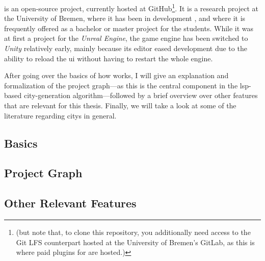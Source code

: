 \documentclass[../thesis]{subfiles}
\begin{document}

\SEE{} is an open-source project, currently hosted at GitHub\footnote{ (but note that, to clone this repository, you additionally need access to the Git LFS counterpart hosted at the University of Bremen's GitLab, as this is where paid plugins for \SEE{} are hosted.)}.
It is a research project at the University of Bremen, where it has been in development , and where it is frequently offered as a bachelor or master project for the students.
While it was at first a project for the \emph{Unreal Engine}, the game engine has been switched to \emph{Unity} relatively early, mainly because its editor eased development due to the ability to reload the \gls*{ui} without having to restart the whole engine.

After going over the basics of how \SEE{} works, I will give an explanation and formalization of the project graph---as this is the central component in the \gls{lsp}-based \gls{city}-generation algorithm---followed by a brief overview over other features that are relevant for this thesis.
Finally, we will take a look at some of the literature regarding \glspl{city} in general.

\subsection{Basics}
\fxfatal{}


\subsection{Project Graph}
\fxfatal{}


\subsection{Other Relevant Features}
\fxfatal{}
\end{document}
